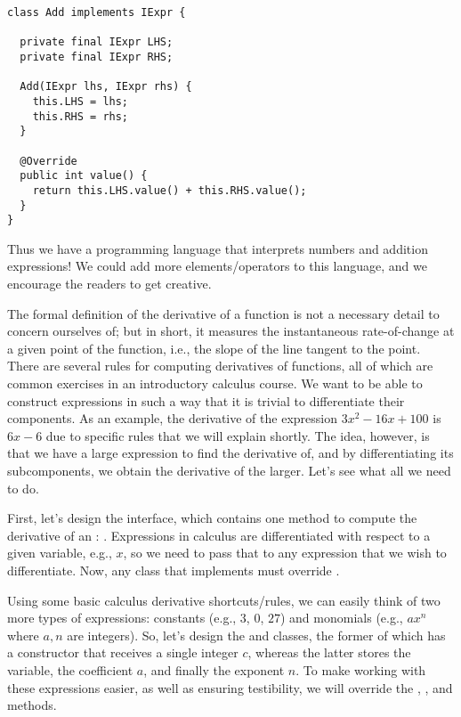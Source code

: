 \begin{lstlisting}[language=MyJava]
class Add implements IExpr {

  private final IExpr LHS;
  private final IExpr RHS;

  Add(IExpr lhs, IExpr rhs) {
    this.LHS = lhs;
    this.RHS = rhs;
  }

  @Override
  public int value() { 
    return this.LHS.value() + this.RHS.value(); 
  }
}
\end{lstlisting}
Thus we have a programming language that interprets numbers and addition expressions! We could add more elements/operators to this language, and we encourage the readers to get creative.


The formal definition of the derivative of a function is not a necessary detail to concern ourselves of; but in short, it measures the instantaneous rate-of-change at a given point of the function, i.e., the slope of the line tangent to the point. There are several rules for computing derivatives of functions, all of which are common exercises in an introductory calculus course. We want to be able to construct expressions in such a way that it is trivial to differentiate their components. As an example, the derivative of the expression $3x^2 - 16x + 100$ is $6x - 6$ due to specific rules that we will explain shortly. The idea, however, is that we have a large expression to find the derivative of, and by differentiating its subcomponents, we obtain the derivative of the larger. Let's see what all we need to do.

First, let's design the  interface, which contains one method to compute the derivative of an : . Expressions in calculus are differentiated with respect to a given variable, e.g., $x$, so we need to pass that to any expression that we wish to differentiate. Now, any class that implements  must override . 

Using some basic calculus derivative shortcuts/rules, we can easily think of two more types of expressions: constants (e.g., $3$, $0$, $27$) and monomials (e.g., $ax^n$ where $a, n$ are integers). So, let's design the  and  classes, the former of which has a constructor that receives a single integer $c$, whereas the latter stores the variable, the coefficient $a$, and finally the exponent $n$. To make working with these expressions easier, as well as ensuring testibility, we will override the , , and  methods.

